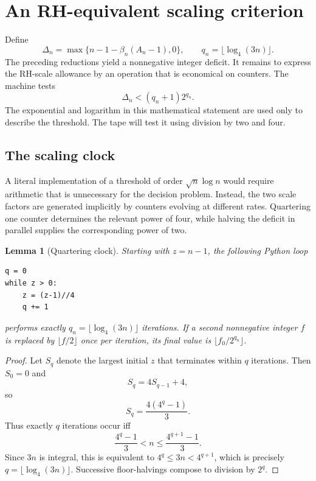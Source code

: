 \documentclass[10pt]{article}
\newtheorem{lemma}[theorem]{Lemma}
\theoremstyle{definition}
\begin{document}
\section{An RH-equivalent scaling criterion}

Define
\begin{equation}
\label{eq:Deltaq}
\Delta_n=\max\{n-1-\beta_n(A_n-1),0\},
\qquad
q_n=\lfloor\log_4(3n)\rfloor.
\end{equation}
The preceding reductions yield a nonnegative integer deficit. It remains to
express the RH-scale allowance by an operation that is economical on counters.
The machine tests
\begin{equation}
\label{eq:criterion}
\Delta_n<(q_n+1)2^{q_n}.
\end{equation}
The exponential and logarithm in this mathematical statement are used only to
describe the threshold. The tape will test it using division by two and four.

\subsection{The scaling clock}

A literal implementation of a threshold of order $\sqrt n\log n$ would
require arithmetic that is unnecessary for the decision problem. Instead,
the two scale factors are generated implicitly by counters evolving at
different rates. Quartering one counter determines the relevant power of
four, while halving the deficit in parallel supplies the corresponding power
of two.

\begin{lemma}[Quartering clock]
\label{lem:clock}
Starting with $z=n-1$, the following Python loop
\begin{lstlisting}
q = 0
while z > 0:
    z = (z-1)//4
    q += 1
\end{lstlisting}
performs exactly $q_n=\lfloor\log_4(3n)\rfloor$ iterations. If a second
nonnegative integer $f$ is replaced by $\lfloor f/2\rfloor$ once per
iteration, its final value is $\lfloor f_0/2^{q_n}\rfloor$.
\end{lemma}

\begin{proof}
Let $S_q$ denote the largest initial $z$ that terminates within $q$
iterations. Then $S_0=0$ and
\[
S_q=4S_{q-1}+4,
\]
so
\[
S_q=\frac{4(4^q-1)}3.
\]
Thus exactly $q$ iterations occur iff
\[
\frac{4^q-1}{3}<n\le\frac{4^{q+1}-1}{3}.
\]
Since $3n$ is integral, this is equivalent to $4^q\le3n<4^{q+1}$, which is
precisely $q=\lfloor\log_4(3n)\rfloor$. Successive floor-halvings compose to
division by $2^q$.
\end{proof}
\end{document}
